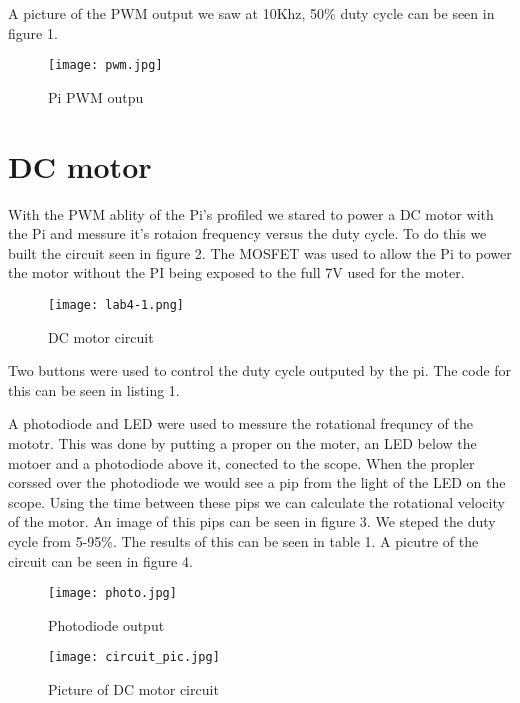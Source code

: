 \documentclass[prl,12pt,notitlepage,aps,onecolumn,superscriptaddress]{revtex4-1}
\begin{document}
A picture of the PWM output we saw at 10Khz, 50\% duty cycle can be seen in figure 1.

\begin{figure}[h]
\begin{center}
\texttt{[image: pwm.jpg]}
\end{center}
\caption{\label{fig:pic} Pi PWM outpu}
\end{figure}

\section{DC motor}
With the PWM ablity of the Pi's profiled we stared to power a DC motor with the Pi and messure it's rotaion frequency versus the duty cycle. To do this we built the circuit seen in figure 2. The MOSFET was used to allow the Pi to power the motor without the PI being exposed to the full 7V used for the moter. 

\begin{figure}[h]
\begin{center}
\texttt{[image: lab4-1.png]}
\end{center}
\caption{\label{fig:pic}DC motor circuit}
\end{figure}

Two buttons were used to control the duty cycle outputed by the pi. The code for this can be seen in listing 1.

A photodiode and LED were used to messure the rotational frequncy of the mototr. This was done by putting a proper on the moter, an LED below the motoer and a photodiode above it, conected to the scope. When the propler corssed over the photodiode we would see a pip from the light of the LED on the scope. Using the time between these pips we can calculate the rotational velocity of the motor. An image of this pips can be seen in figure 3. We steped the duty cycle from 5-95\%. The results of this can be seen in table 1.  A picutre of the circuit can be seen in figure 4.

\begin{figure}[h]
\begin{center}
\texttt{[image: photo.jpg]}
\end{center}
\caption{\label{fig:pic} Photodiode output}
\end{figure}

\begin{figure}[h]
\begin{center}
\texttt{[image: circuit\_pic.jpg]}
\end{center}
\caption{\label{fig:pic} Picture of DC motor circuit}
\end{figure}
 
\end{document}
